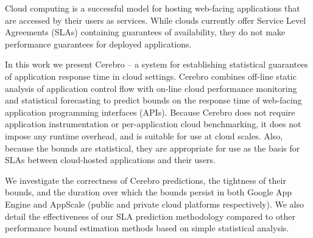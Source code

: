 Cloud computing is a successful model for hosting web-facing
applications that are accessed by their users as services.  While clouds
currently offer Service Level Agreements (SLAs) containing guarantees of
availability, they do not make performance guarantees for deployed
applications.

In this work we present Cerebro -- a system for establishing statistical
guarantees of application response time in cloud settings.  Cerebro combines
off-line static analysis of application control flow with on-line cloud
performance monitoring and statistical forecasting to predict bounds on the
response time of web-facing application programming interfaces (APIs).
Because Cerebro does not require application instrumentation or 
per-application cloud benchmarking, it does not impose any runtime overhead,
and is suitable for use at cloud scales.  Also, because the bounds are
statistical, they are appropriate for use as the basis for SLAs between
cloud-hosted applications and their users.

We investigate the correctness of Cerebro predictions, the tightness of their
bounds, and the duration over which the bounds persist in both Google App
Engine and AppScale (public and private cloud platforms respectively).  
We also detail the effectiveness of our SLA prediction methodology compared 
to other performance bound estimation methods based on simple statistical
analysis. 


